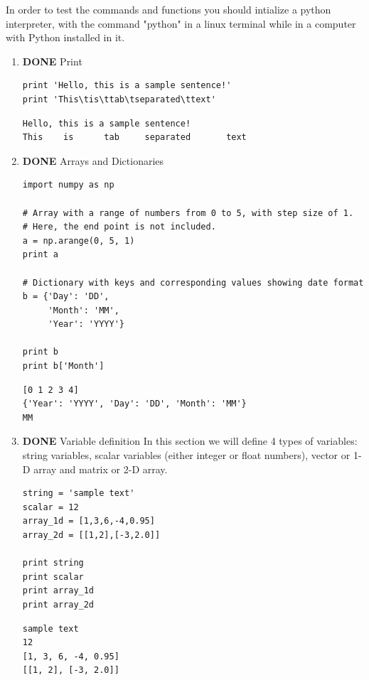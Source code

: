 \documentclass[11pt]{article}
\begin{document}
In order to test the commands and functions you should intialize a python interpreter, with the command "python" in a linux terminal while in a computer with Python installed in it.
\begin{enumerate}
\item {\bfseries\sffamily DONE} Print
\label{sec-2-2-2-1}
\begin{verbatim}
print 'Hello, this is a sample sentence!'
print 'This\tis\ttab\tseparated\ttext'
\end{verbatim}

\begin{verbatim}
Hello, this is a sample sentence!
This    is      tab     separated       text
\end{verbatim}

\item {\bfseries\sffamily DONE} Arrays and Dictionaries
\label{sec-2-2-2-2}
\begin{verbatim}
import numpy as np

# Array with a range of numbers from 0 to 5, with step size of 1.
# Here, the end point is not included.
a = np.arange(0, 5, 1)
print a

# Dictionary with keys and corresponding values showing date format
b = {'Day': 'DD',
     'Month': 'MM',
     'Year': 'YYYY'}

print b
print b['Month']
\end{verbatim}

\begin{verbatim}
[0 1 2 3 4]
{'Year': 'YYYY', 'Day': 'DD', 'Month': 'MM'}
MM
\end{verbatim}

\item {\bfseries\sffamily DONE} Variable definition
\label{sec-2-2-2-3}
In this section we will define 4 types of variables: string variables, scalar variables (either integer or float numbers), vector or 1-D array and matrix or 2-D array.
\begin{verbatim}
string = 'sample text'
scalar = 12
array_1d = [1,3,6,-4,0.95]
array_2d = [[1,2],[-3,2.0]]

print string 
print scalar
print array_1d
print array_2d
\end{verbatim}

\begin{verbatim}
sample text
12
[1, 3, 6, -4, 0.95]
[[1, 2], [-3, 2.0]]
\end{verbatim}
\end{enumerate}
\end{document}
